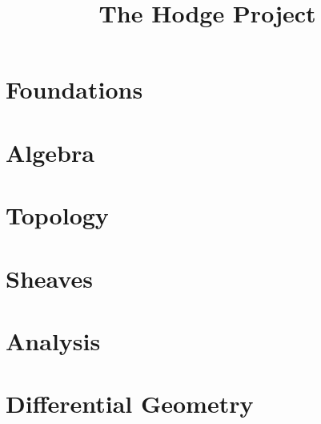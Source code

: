 \documentclass[11pt,openany]{book}
\title{The Hodge Project}
\author{}
\date{}
\begin{document}
\ifplastex\else
  \maketitle
  \tableofcontents
\fi



\part{Foundations}\label{part-foundations}






\part{Algebra}\label{part-algebra}












\part{Topology}\label{part-topology}








\part{Sheaves}\label{part-sheaves}



\part{Analysis}\label{part-analysis}







\part{Differential Geometry}\label{part-differential-geometry}











\end{document}

